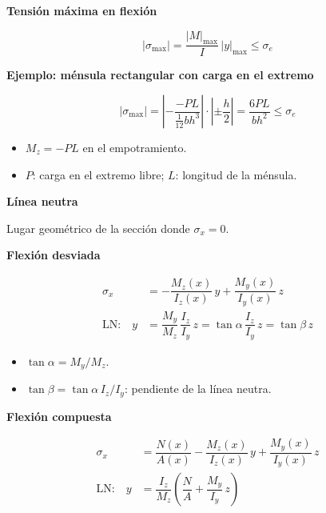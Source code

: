 \documentclass[10pt,a4paper]{article}
\begin{document}
\begin{tcolorbox}[itembox]
\textbf{Tensión máxima en flexión}\par
\[
|\sigma_{\max}|=\dfrac{|M|_{\max}}{I}\,|y|_{\max}\le\sigma_e
\]
\end{tcolorbox}

\begin{tcolorbox}[itembox]
\textbf{Ejemplo: ménsula rectangular con carga en el extremo}\par
\[
|\sigma_{\max}|=\left|-\dfrac{-PL}{\frac{1}{12}bh^{3}}\right|\cdot\left|\pm\dfrac{h}{2}\right|=\dfrac{6PL}{bh^{2}}\le\sigma_e
\]
{\small\begin{itemize}[leftmargin=*,nosep,label={--}]
\item $M_z=-PL$ en el empotramiento.
\item $P$: carga en el extremo libre; $L$: longitud de la ménsula.
\end{itemize}}
\end{tcolorbox}

\begin{tcolorbox}[itembox]
\textbf{Línea neutra}\par
\smallskip\noindent Lugar geométrico de la sección donde $\sigma_x=0$.\par
\end{tcolorbox}

\begin{tcolorbox}[itembox]
\textbf{Flexión desviada}\par
\[
\begin{aligned}\sigma_x&=-\dfrac{M_z(x)}{I_z(x)}\,y+\dfrac{M_y(x)}{I_y(x)}\,z\\ \text{LN:}\quad y&=\dfrac{M_y}{M_z}\,\dfrac{I_z}{I_y}\,z=\tan\alpha\,\dfrac{I_z}{I_y}\,z=\tan\beta\,z\end{aligned}
\]
{\small\begin{itemize}[leftmargin=*,nosep,label={--}]
\item $\tan\alpha=M_y/M_z$.
\item $\tan\beta=\tan\alpha\,I_z/I_y$: pendiente de la línea neutra.
\end{itemize}}
\smallskip{}\par
\end{tcolorbox}

\begin{tcolorbox}[itembox]
\textbf{Flexión compuesta}\par
\[
\begin{aligned}\sigma_x&=\dfrac{N(x)}{A(x)}-\dfrac{M_z(x)}{I_z(x)}\,y+\dfrac{M_y(x)}{I_y(x)}\,z\\ \text{LN:}\quad y&=\dfrac{I_z}{M_z}\left(\dfrac{N}{A}+\dfrac{M_y}{I_y}\,z\right)\end{aligned}
\]
\end{tcolorbox}
\end{document}
